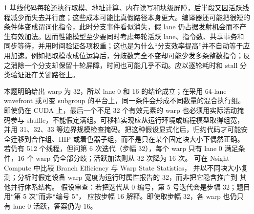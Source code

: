 \begin{solutionexercise}{1}
基线代码每轮还执行取模、地址计算、内存读写和块级屏障，后半段又因活跃线程减少而失去并行度；这些成本可能比真假路径本身更大。编译器还可能把很短的条件体变成谓词化指令，此时分支事件看似消失，假 lane 仍占据发射机会而不产生有效加法。因而性能模型至少要同时考虑每轮活跃 lane、指令数、共享事务和同步等待，并用时间验证各项权重；这也是为什么“分支效率提高”并不自动等于应用加速。例如把取模改成位运算后，分歧数完全不变却可能少发多条整数指令；反之消除一个分支却保留十轮屏障，时间也可能几乎不动。应以逐轮耗时和 stall 分类验证谁在关键路径上。

本题明确给出 warp 为 32，所以 lane 0 和 16 的结论成立；在采用 64-lane wavefront 或可变 subgroup 的平台上，同一条件会形成不同数量的混合执行组。即使仍在 CUDA 上，最后一个不足 32 个有效元素的 warp 也必须用实际活动掩码参与 shuffle，不能假定满组。可移植实现应从运行环境或编程模型取得组宽，并用 31、32、33 等边界规模检查掩码。把这种假设显式化后，归约代码才可能安全迁移到合作组、HIP 或着色器子组，而不是只在某个固定块大小下偶然正确。
\variantheading 若仍有 512 个线程，但问第 6 次迭代（步幅 32），每个 warp 只有 lane 0
满足条件，16 个 warp 仍全部分歧；活跃加法则从 32 次降为 16 次。
\practiceheading 可在 Nsight Compute 中比较 Branch Efficiency 与 Warp State Statistics，
并以不同块大小复测；分析时假定设备 warp 宽度为运行时属性报告的 32，而非把它隐含推广到
其他并行体系结构。
假设审查：若把迭代从 0 编号，第 5 号迭代会是步幅 32；题目用“第 5 次”而非“编号 5”，
应按步幅 16 解释。即使取步幅 32，各 warp 也仍只有 lane 0 活跃，答案仍为 16。
\end{solutionexercise}

